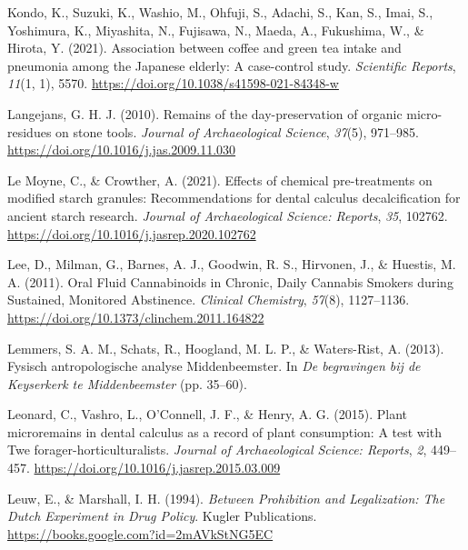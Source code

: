 \documentclass[
  letterpaper,
]{book}
\newlength{\cslhangindent}
\newlength{\cslentryspacingunit} %
\newenvironment{CSLReferences}[2] %
 {%
  \setlength{\parindent}{0pt}
  \ifodd #1
  \let\oldpar\par
  \def\par{\hangindent=\cslhangindent\oldpar}
  \fi
  \setlength{\parskip}{#2\cslentryspacingunit}
 }%
 {}
\begin{document}
\begin{CSLReferences}{1}{0}
\leavevmode{}%
Kondo, K., Suzuki, K., Washio, M., Ohfuji, S., Adachi, S., Kan, S.,
Imai, S., Yoshimura, K., Miyashita, N., Fujisawa, N., Maeda, A.,
Fukushima, W., \& Hirota, Y. (2021). Association between coffee and
green tea intake and pneumonia among the {Japanese} elderly: A
case-control study. \emph{Scientific Reports}, \emph{11}(1, 1), 5570.
\url{https://doi.org/10.1038/s41598-021-84348-w}

\leavevmode{}%
Langejans, G. H. J. (2010). Remains of the day-preservation of organic
micro-residues on stone tools. \emph{Journal of Archaeological Science},
\emph{37}(5), 971--985. \url{https://doi.org/10.1016/j.jas.2009.11.030}

\leavevmode{}%
Le Moyne, C., \& Crowther, A. (2021). Effects of chemical pre-treatments
on modified starch granules: {Recommendations} for dental calculus
decalcification for ancient starch research. \emph{Journal of
Archaeological Science: Reports}, \emph{35}, 102762.
\url{https://doi.org/10.1016/j.jasrep.2020.102762}

\leavevmode{}%
Lee, D., Milman, G., Barnes, A. J., Goodwin, R. S., Hirvonen, J., \&
Huestis, M. A. (2011). Oral {Fluid Cannabinoids} in {Chronic}, {Daily
Cannabis Smokers} during {Sustained}, {Monitored Abstinence}.
\emph{Clinical Chemistry}, \emph{57}(8), 1127--1136.
\url{https://doi.org/10.1373/clinchem.2011.164822}

\leavevmode{}%
Lemmers, S. A. M., Schats, R., Hoogland, M. L. P., \& Waters-Rist, A.
(2013). Fysisch antropologische analyse Middenbeemster. In \emph{De
begravingen bij de Keyserkerk te Middenbeemster} (pp. 35--60).

\leavevmode{}%
Leonard, C., Vashro, L., O'Connell, J. F., \& Henry, A. G. (2015). Plant
microremains in dental calculus as a record of plant consumption: {A}
test with {Twe} forager-horticulturalists. \emph{Journal of
Archaeological Science: Reports}, \emph{2}, 449--457.
\url{https://doi.org/10.1016/j.jasrep.2015.03.009}

\leavevmode{}%
Leuw, E., \& Marshall, I. H. (1994). \emph{Between {Prohibition} and
{Legalization}: {The Dutch Experiment} in {Drug Policy}}. {Kugler
Publications}. \url{https://books.google.com?id=2mAVkStNG5EC}


\end{CSLReferences}
\end{document}
